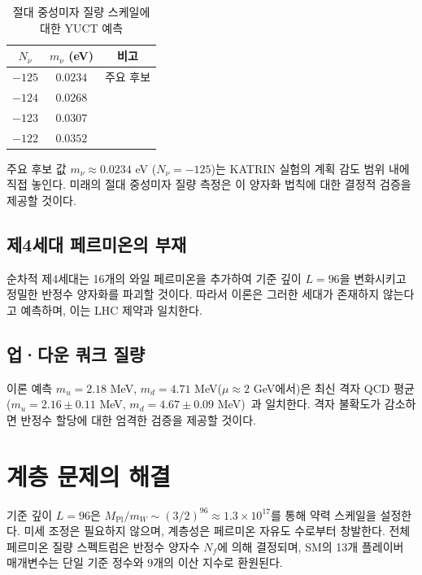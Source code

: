\documentclass[12pt,a4paper]{article}
\begin{document}
	\begin{table}[htbp]
		\centering
		\caption{절대 중성미자 질량 스케일에 대한 YUCT 예측}
		\label{tab:neutrino}
		\begin{tabular}{c c c}
			\toprule
			\(N_\nu\) & \(m_\nu\) (eV) & 비고 \\
			\midrule
			\(-125\) & \(0.0234\) & 주요 후보 \\
			\(-124\) & \(0.0268\) & \\
			\(-123\) & \(0.0307\) & \\
			\(-122\) & \(0.0352\) & \\
			\bottomrule
		\end{tabular}
	\end{table}
	
	주요 후보 값 \(m_\nu \approx 0.0234\) eV (\(N_\nu = -125\))는 KATRIN 실험의 계획 감도 범위 내에 직접 놓인다. 미래의 절대 중성미자 질량 측정은 이 양자화 법칙에 대한 결정적 검증을 제공할 것이다.
	
	\subsection{제4세대 페르미온의 부재}
	
	순차적 제4세대는 16개의 와일 페르미온을 추가하여 기준 깊이 \(L=96\)을 변화시키고 정밀한 반정수 양자화를 파괴할 것이다. 따라서 이론은 그러한 세대가 존재하지 않는다고 예측하며, 이는 LHC 제약과 일치한다.
	
	\subsection{업·다운 쿼크 질량}
	
	이론 예측 \(m_u = 2.18\) MeV, \(m_d = 4.71\) MeV(\(\mu \approx 2\) GeV에서)은 최신 격자 QCD 평균(\(m_u = 2.16 \pm 0.11\) MeV, \(m_d = 4.67 \pm 0.09\) MeV)~\cite{PDG2024}과 일치한다. 격자 불확도가 감소하면 반정수 할당에 대한 엄격한 검증을 제공할 것이다.
	
	\section{계층 문제의 해결}
	
	기준 깊이 \(L=96\)은 \(M_{\mathrm{Pl}}/m_W \sim (3/2)^{96} \approx 1.3\times10^{17}\)를 통해 약력 스케일을 설정한다. 미세 조정은 필요하지 않으며, 계층성은 페르미온 자유도 수로부터 창발한다. 전체 페르미온 질량 스펙트럼은 반정수 양자수 \(N_f\)에 의해 결정되며, SM의 13개 플레이버 매개변수는 단일 기준 정수와 9개의 이산 지수로 환원된다.
	
\end{document}

